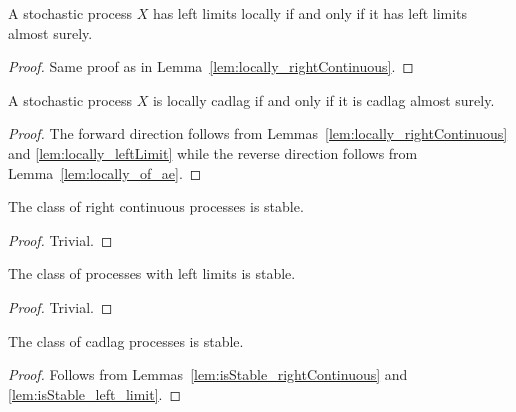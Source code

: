 \begin{lemma}\label{lem:locally_leftLimit}
  \leanok
  A stochastic process $X$ has left limits locally if and only if it has left limits almost surely.
\end{lemma}

\begin{proof}
  Same proof as in Lemma~\ref{lem:locally_rightContinuous}.
\end{proof}

\begin{lemma}\label{lem:locally_isCadlag}
  \leanok
  A stochastic process $X$ is locally cadlag if and only if it is cadlag almost surely.
\end{lemma}

\begin{proof}\leanok
  The forward direction follows from Lemmas~\ref{lem:locally_rightContinuous} and \ref{lem:locally_leftLimit}
  while the reverse direction follows from Lemma~\ref{lem:locally_of_ae}.
\end{proof}

\begin{lemma}\label{lem:isStable_rightContinuous}
  \leanok
  The class of right continuous processes is stable.
\end{lemma}

\begin{proof}\leanok
  Trivial.
\end{proof}

\begin{lemma}\label{lem:isStable_left_limit}
  \leanok
  The class of processes with left limits is stable.
\end{lemma}

\begin{proof}\leanok
  Trivial.
\end{proof}

\begin{lemma}\label{lem:isStable_isCadlag}
  \leanok
  The class of cadlag processes is stable.
\end{lemma}

\begin{proof}
  \leanok
  Follows from Lemmas~\ref{lem:isStable_rightContinuous} and \ref{lem:isStable_left_limit}.
\end{proof}

